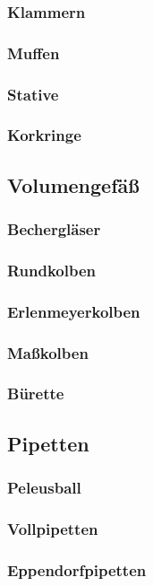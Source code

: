 \subsubsection{Klammern}

\subsubsection{Muffen}
\subsubsection{Stative}
\subsubsection{Korkringe}

\subsection{Volumengefäß}
\subsubsection{Bechergläser}
\subsubsection{Rundkolben}
\subsubsection{Erlenmeyerkolben}
\subsubsection{Maßkolben}
\subsubsection{Bürette}

\subsection{Pipetten}
\subsubsection{Peleusball}
\subsubsection{Vollpipetten}
\subsubsection{Eppendorfpipetten}
